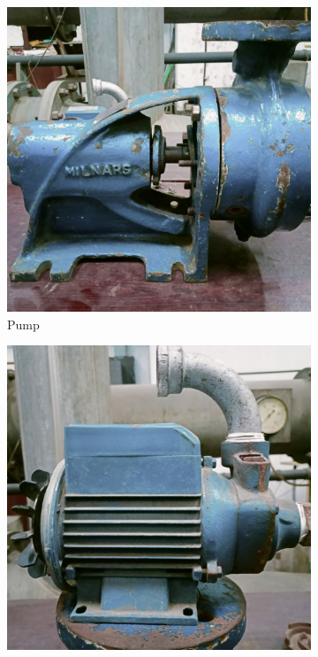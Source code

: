 \documentclass[12pt]{article}
\begin{document}
\begin{figure}[h]
    \centering
    \begin{subfigure}{0.3\textwidth}
        \includegraphics[width=\linewidth]{img/p_01.jpg}
        \caption{Pump}  
    \end{subfigure}
    \hfill
    \begin{subfigure}{0.3\textwidth}
        \includegraphics[width=\linewidth]{img/p_02.jpg}

\end{subfigure}
\end{figure}
\end{document}
